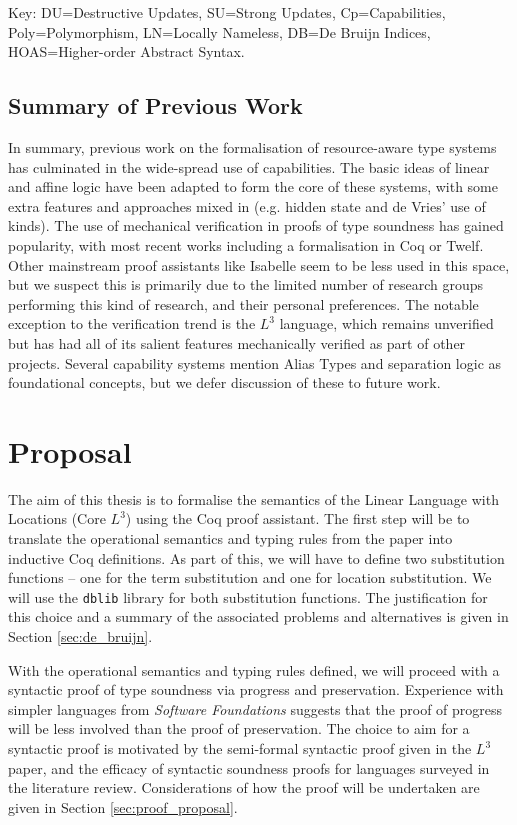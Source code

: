\documentclass[]{unswthesis}
\begin{document}
Key: DU=Destructive Updates, SU=Strong Updates, Cp=Capabilities, Poly=Polymorphism, LN=Locally Nameless, DB=De Bruijn Indices, HOAS=Higher-order Abstract Syntax.

\section{Summary of Previous Work}

In summary, previous work on the formalisation of resource-aware type systems has culminated in the wide-spread use of capabilities. The basic ideas of linear and affine logic have been adapted to form the core of these systems, with some extra features and approaches mixed in (e.g. hidden state and de Vries' use of kinds). The use of mechanical verification in proofs of type soundness has gained popularity, with most recent works including a formalisation in Coq or Twelf. Other mainstream proof assistants like Isabelle seem to be less used in this space, but we suspect this is primarily due to the limited number of research groups performing this kind of research, and their personal preferences. The notable exception to the verification trend is the $L^3$ language, which remains unverified but has had all of its salient features mechanically verified as part of other projects. Several capability systems mention Alias Types \cite{smith00} and separation logic \cite{reynolds02} as foundational concepts, but we defer discussion of these to future work.

\chapter{Proposal}
\label{ch:proposal}

The aim of this thesis is to formalise the semantics of the Linear Language with Locations (Core $L^3$) using the Coq proof assistant. The first step will be to translate the operational semantics and typing rules from the paper \cite{ahmed05} into inductive Coq definitions. As part of this, we will have to define two substitution functions -- one for the term substitution and one for location substitution. We will use the \texttt{dblib} library \cite{dblib13} for both substitution functions. The justification for this choice and a summary of the associated problems and alternatives is given in Section \ref{sec:de_bruijn}.

With the operational semantics and typing rules defined, we will proceed with a syntactic proof of type soundness via progress and preservation. Experience with simpler languages from \textit{Software Foundations} \cite{pierce15} suggests that the proof of progress will be less involved than the proof of preservation. The choice to aim for a syntactic proof is motivated by the semi-formal syntactic proof given in the $L^3$ paper, and the efficacy of syntactic soundness proofs for languages surveyed in the literature review. Considerations of how the proof will be undertaken are given in Section \ref{sec:proof_proposal}.
\end{document}

